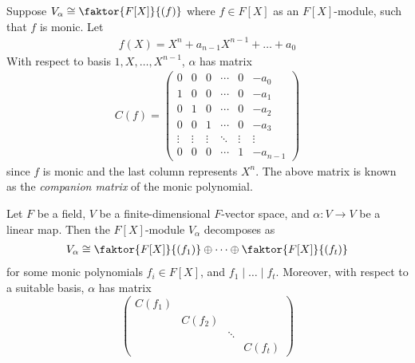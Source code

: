 \begin{example}
	Suppose $V_\alpha \cong \faktor{F[X]}{(f)}$ where $f \in F[X]$ as an $F[X]$-module, such that $f$ is monic.
	Let
	\begin{align*}
		f(X) = X^n + a_{n-1} X^{n-1} + \dots + a_0
	\end{align*}
	With respect to basis $1, X, \dots, X^{n-1}$, $\alpha$ has matrix
	\begin{align*}
		C(f) =
		\begin{pmatrix}
			0      & 0      & 0      & \cdots & 0      & -a_0     \\
			1      & 0      & 0      & \cdots & 0      & -a_1     \\
			0      & 1      & 0      & \cdots & 0      & -a_2     \\
			0      & 0      & 1      & \cdots & 0      & -a_3     \\
			\vdots & \vdots & \vdots & \ddots & \vdots & \vdots   \\
			0      & 0      & 0      & \cdots & 1      & -a_{n-1}
		\end{pmatrix}
	\end{align*}
	since $f$ is monic and the last column represents $X^n$.
	The above matrix is known as the \textit{companion matrix} of the monic polynomial.
\end{example}

\begin{theorem}
	Let $F$ be a field, $V$ be a finite-dimensional $F$-vector space, and $\alpha : V \to V$ be a linear map.
	Then the $F[X]$-module $V_\alpha$ decomposes as
	\begin{align*}
		V_\alpha \cong \faktor{F[X]}{(f_1)} \oplus \dots \oplus \faktor{F[X]}{(f_t)}
	\end{align*}
	for some monic polynomials $f_i \in F[X]$, and $f_1 \mid \dots \mid f_t$.
	Moreover, with respect to a suitable basis, $\alpha$ has matrix
	\begin{equation}
		\begin{pmatrix}
			C(f_1)                      \\
			 & C(f_2)                   \\
			 &        & \ddots          \\
			 &        &        & C(f_t)
		\end{pmatrix}
		\tag{\(\ast\ast\)}
	\end{equation}
\end{theorem}


